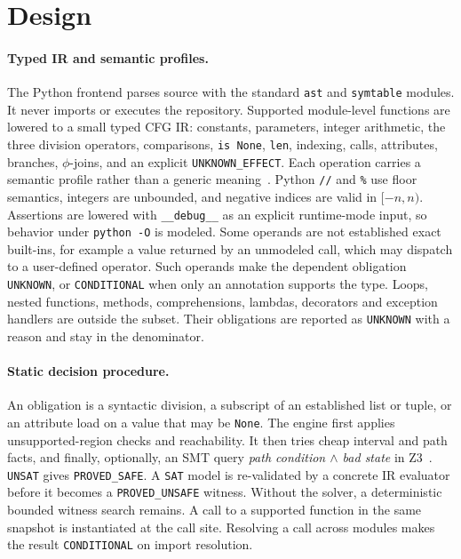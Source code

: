 \documentclass[10pt,twocolumn]{article}
\newcommand{\res}[1]{\texttt{\small #1}}
\begin{document}
\section{Design}
\label{sec:design}

\paragraph{Typed IR and semantic profiles.}
The Python frontend parses source with the standard \texttt{ast} and \texttt{symtable} modules. It never imports or
executes the repository. Supported module-level functions are lowered to a small typed CFG IR: constants, parameters,
integer arithmetic, the three division operators, comparisons, \texttt{is None}, \texttt{len}, indexing, calls,
attributes, branches, $\phi$-joins, and an explicit \texttt{UNKNOWN\_EFFECT}. Each operation carries a semantic profile
rather than a generic meaning~\cite{python_expressions}. Python \texttt{//} and \texttt{\%} use floor semantics,
integers are unbounded, and negative indices are valid in $[-n, n)$. Assertions are lowered with
\texttt{\_\_debug\_\_} as an explicit runtime-mode input, so behavior under \texttt{python -O} is modeled. Some operands
are not established exact built-ins, for example a value returned by an unmodeled call, which may dispatch to a
user-defined operator. Such operands make the dependent obligation \res{UNKNOWN}, or \res{CONDITIONAL} when only an
annotation supports the type. Loops, nested functions, methods, comprehensions, lambdas, decorators and exception
handlers are outside the subset. Their obligations are reported as \res{UNKNOWN} with a reason and stay in the
denominator.

\paragraph{Static decision procedure.}
An obligation is a syntactic division, a subscript of an established list or tuple, or an attribute load on a value
that may be \texttt{None}. The engine first applies unsupported-region checks and reachability. It then tries cheap
interval and path facts, and finally, optionally, an SMT query \emph{path condition $\wedge$ bad state} in
Z3~\cite{demoura2008z3}. \texttt{UNSAT} gives \res{PROVED\_SAFE}. A \texttt{SAT} model is re-validated by a concrete IR
evaluator before it becomes a \res{PROVED\_UNSAFE} witness. Without the solver, a deterministic bounded witness search
remains. A call to a supported function in the same snapshot is instantiated at the call site. Resolving a call across
modules makes the result \res{CONDITIONAL} on import resolution.
\end{document}
